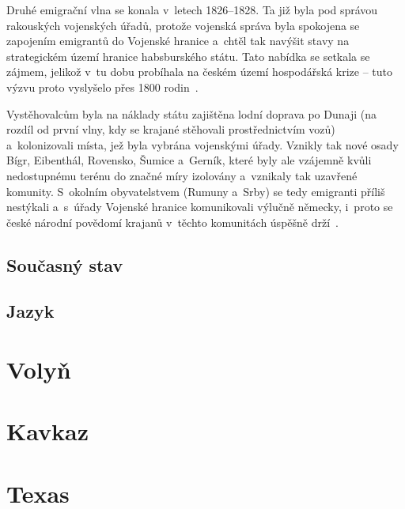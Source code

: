 Druhé emigrační vlna se konala v~letech 1826--1828. Ta již byla pod správou rakouských vojenských úřadů, protože vojenská správa byla spokojena se zapojením emigrantů do Vojenské hranice a~chtěl tak navýšit stavy na strategickém území hranice habsburského státu. Tato nabídka se setkala se zájmem, jelikož v~tu dobu probíhala na českém území hospodářská krize -- tuto výzvu proto vyslyšelo přes 1800 rodin~\parencite{Frnochova2012}.

Vystěhovalcům byla na náklady státu zajištěna lodní doprava po Dunaji (na rozdíl od první vlny, kdy se krajané stěhovali prostřednictvím vozů) a~kolonizovali místa, jež byla vybrána vojenskými úřady. Vznikly tak nové osady Bígr, Eibenthál, Rovensko, Šumice a~Gerník, které byly ale vzájemně kvůli nedostupnému terénu do značné míry izolovány a~vznikaly tak uzavřené komunity. S~okolním obyvatelstvem (Rumuny a~Srby) se tedy emigranti příliš nestýkali a~s~úřady Vojenské hranice komunikovali výlučně německy, i~proto se české národní povědomí krajanů v~těchto komunitách úspěšně drží~\parencite{Secka1995}.

\hypertarget{souux10dasnuxfd-stav}{%
\subsection*{Současný stav}\label{souux10dasnuxfd-stav}}

\hypertarget{jazyk}{%
\subsection*{Jazyk}\label{jazyk}}

\hypertarget{volyux148}{%
\section{Volyň}\label{volyux148}}

\hypertarget{kavkaz}{%
\section{Kavkaz}\label{kavkaz}}

\hypertarget{texas}{%
\section{Texas}\label{texas}}
